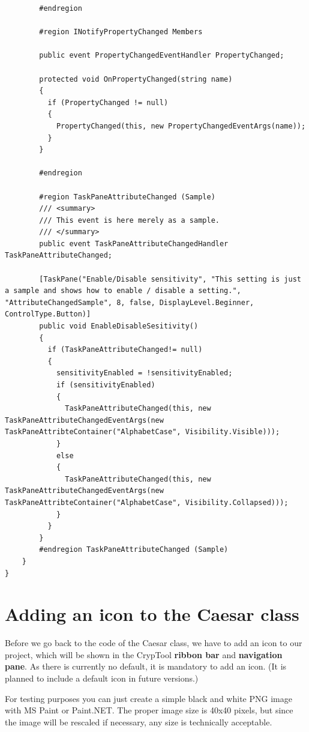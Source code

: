\begin{lstlisting}
        #endregion

        #region INotifyPropertyChanged Members

        public event PropertyChangedEventHandler PropertyChanged;

        protected void OnPropertyChanged(string name)
        {
          if (PropertyChanged != null)
          {
            PropertyChanged(this, new PropertyChangedEventArgs(name));
          }
        }

        #endregion

        #region TaskPaneAttributeChanged (Sample)
        /// <summary>
        /// This event is here merely as a sample.
        /// </summary>
        public event TaskPaneAttributeChangedHandler TaskPaneAttributeChanged;

        [TaskPane("Enable/Disable sensitivity", "This setting is just a sample and shows how to enable / disable a setting.", "AttributeChangedSample", 8, false, DisplayLevel.Beginner, ControlType.Button)]
        public void EnableDisableSesitivity()
        {
          if (TaskPaneAttributeChanged!= null)
          {
            sensitivityEnabled = !sensitivityEnabled;
            if (sensitivityEnabled)
            {
              TaskPaneAttributeChanged(this, new TaskPaneAttributeChangedEventArgs(new TaskPaneAttribteContainer("AlphabetCase", Visibility.Visible)));
            }
            else
            {
              TaskPaneAttributeChanged(this, new TaskPaneAttributeChangedEventArgs(new TaskPaneAttribteContainer("AlphabetCase", Visibility.Collapsed)));
            }
          }
        }
        #endregion TaskPaneAttributeChanged (Sample)
    }
}
\end{lstlisting}
\clearpage

\section{Adding an icon to the Caesar class}
\label{sec:AddingAnIconToTheCaesarClass}

Before we go back to the code of the Caesar class, we have to add an icon to our project, which will be shown in the CrypTool \textbf{ribbon bar} and \textbf{navigation pane}. As there is currently no default, it is mandatory to add an icon. (It is planned to include a default icon in future versions.)

For testing purposes you can just create a simple black and white PNG image with MS Paint or Paint.NET. The proper image size is 40x40 pixels, but since the image will be rescaled if necessary, any size is technically acceptable.

